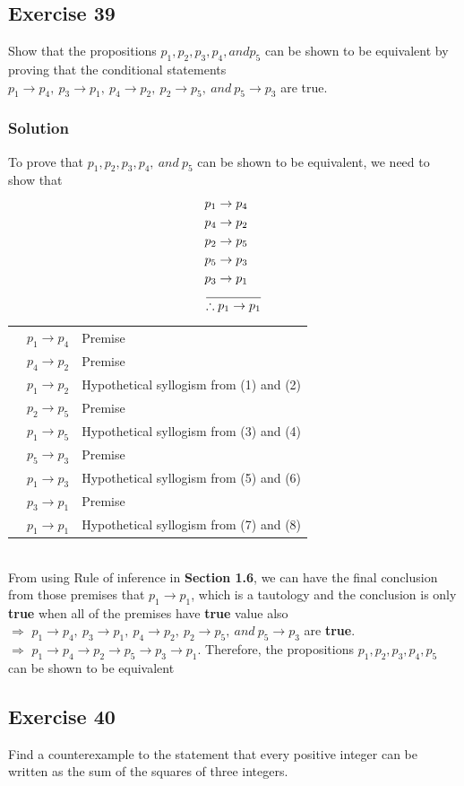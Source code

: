 \documentclass{article}
\begin{document}
\subsection*{Exercise 39}
Show that the propositions $p_1, p_2, p_3, p_4, and p_5$ can be shown to be equivalent by proving that the conditional statements $p_1 \to p_4,\ p_3 \to p_1,\ p_4 \to p_2,\ p_2 \to p_5, \ and \ p_5 \to p_3$ are true.
\subsubsection*{Solution}
To prove that $p_1, p_2, p_3, p_4, \ and \ p_5$ can be shown to be equivalent, we need to show that
\begin{align*}
     & p_1 \to p_4                  \\
     & p_4 \to p_2                  \\
     & p_2 \to p_5                  \\
     & p_5 \to p_3                  \\
     & p_3 \to p_1                  \\
     & \over \therefore p_1 \to p_1
\end{align*}
\newcommand{\rowqs}[2]{\stepcounter{rowqx}\arabic{rowqx} & #1 & #2 \\}
\begin{tabular}{r l l}
    \rowqs{$p_1 \to p_4$}{Premise}
    \rowqs{$p_4 \to p_2$}{Premise}
    \rowqs{$p_1 \to p_2$}{Hypothetical syllogism from (1) and (2)}
    \rowqs{$p_2 \to p_5$}{Premise}
    \rowqs{$p_1 \to p_5$}{Hypothetical syllogism from (3) and (4)}
    \rowqs{$p_5 \to p_3$}{Premise}
    \rowqs{$p_1 \to p_3$}{Hypothetical syllogism from (5) and (6)}
    \rowqs{$p_3 \to p_1$}{Premise}
    \rowqs{$p_1 \to p_1$}{Hypothetical syllogism from (7) and (8)}
\end{tabular}\\

From using Rule of inference in \textbf{Section 1.6}, we can have the final conclusion from those premises that $p_1 \to p_1$, which is a tautology and the conclusion is only \textbf{true} when all of the premises have \textbf{true} value also\\
$\Rightarrow$ $p_1 \to p_4,\ p_3 \to p_1,\ p_4 \to p_2,\ p_2 \to p_5, \ and \ p_5 \to p_3$ are \textbf{true}.\\
$\Rightarrow$ $p_1 \to p_4 \to p_2 \to p_5 \to p_3 \to p_1$. Therefore, the propositions $p_1, p_2, p_3, p_4, p_5$ can be shown to be equivalent
\subsection*{Exercise 40}
Find a counterexample to the statement that every positive integer can be written as the sum of the squares of three integers.
\end{document}
